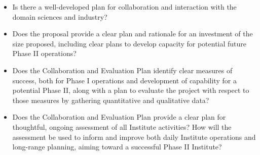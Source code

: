 \documentclass{article}
\begin{document}
\begin{itemize}
    \item Is there a well-developed plan for collaboration and interaction with the domain sciences and industry? 
    
    \item Does the proposal provide a clear plan and rationale for an investment of the size proposed, including clear plans to develop capacity for potential future Phase II operations? 
    
    \item Does the Collaboration and Evaluation Plan identify clear measures of success, both for Phase I operations and development of capability for a potential Phase II, along with a plan to evaluate the project with respect to those measures by gathering quantitative and qualitative data? 
    
    \item Does the Collaboration and Evaluation Plan provide a clear plan for thoughtful, ongoing assessment of all Institute activities? How will the assessment be used to inform and improve both daily Institute operations and long-range planning, aiming toward a successful Phase II Institute? 

\end{itemize}



{

%

}
\end{document}

